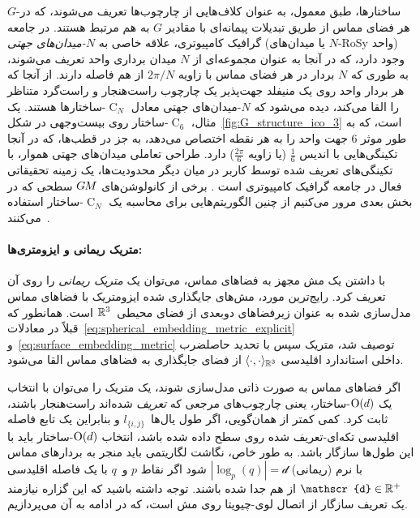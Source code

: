 $G$-ساختارها، طبق معمول، به عنوان کلاف‌هایی از چارچوب‌ها تعریف می‌شوند، که در هر فضای مماس از طریق تبدیلات پیمانه‌ای با مقادیر $G$ به هم مرتبط هستند.
در جامعه گرافیک کامپیوتری، علاقه خاصی به \emph{$N$-میدان‌های جهتی} (یا میدان‌های $N$-RoSy واحد) وجود دارد، که در آنجا به عنوان مجموعه‌ای از $N$ میدان برداری واحد تعریف می‌شوند، به طوری که $N$ بردار در هر فضای مماس با زاویه $2\pi/N$ از هم فاصله دارند.
از آنجا که هر بردار واحد روی یک منیفلد جهت‌پذیر یک چارچوب راست‌هنجار و راست‌گرد متناظر را القا می‌کند، دیده می‌شود که $N$-میدان‌های جهتی معادل $\operatorname{C}_N$-ساختارها هستند.
یک مثال، $\operatorname{C}_6$-ساختار روی بیست‌وجهی در شکل~\ref{fig:G_structure_ico_3} است، که به طور موثر $6$ جهت واحد را به هر نقطه اختصاص می‌دهد، به جز در قطب‌ها، که در آنجا تکینگی‌هایی با اندیس $\frac{1}{6}$ (یا زاویه $\frac{2\pi}{6}$) دارد.
طراحی تعاملی میدان‌های جهتی هموار، با تکینگی‌های تعریف شده توسط کاربر در میان دیگر محدودیت‌ها، یک زمینه تحقیقاتی فعال در جامعه گرافیک کامپیوتری است
\cite{li2006representing,ray2008nSymmDirectionField,lai2009metric,craneTrivialConnectionsDiscrete2010,Knoppel:2013:GOD,liu2016discreteConnection,Sharp2019VectorHeatMethod}.
برخی از کانولوشن‌های $G\mkern-1.4muM$ سطحی که در بخش بعدی مرور می‌کنیم از چنین الگوریتم‌هایی برای محاسبه یک $\operatorname{C}_N$-ساختار استفاده می‌کنند~\cite{huang2019texturenet,Yang2020parallelFrameCNN}.



\paragraph{متریک ریمانی و ایزومتری‌ها:}
با داشتن یک مش مجهز به فضاهای مماس، می‌توان یک \emph{متریک ریمانی} را روی آن تعریف کرد.
رایج‌ترین مورد، مش‌های جایگذاری شده ایزومتریک با فضاهای مماس مدل‌سازی شده به عنوان زیرفضاهای دوبعدی از فضای محیطی~$\mathbb{R}^3$ است.
همانطور که قبلاً در معادلات~\eqref{eq:spherical_embedding_metric_explicit} و~\eqref{eq:surface_embedding_metric} توصیف شد، متریک سپس با تحدید حاصلضرب داخلی استاندارد اقلیدسی $\langle\cdot,\cdot\rangle_{\mathbb{R}^3}$ از فضای جایگذاری به فضاهای مماس القا می‌شود.

اگر فضاهای مماس به صورت ذاتی مدل‌سازی شوند، یک متریک را می‌توان با انتخاب یک $\operatorname{O}(d)$-ساختار، یعنی چارچوب‌های مرجعی که \emph{تعریف} شده‌اند راست‌هنجار باشند، ثابت کرد.
کمی کمتر از همان‌گویی، اگر طول یال‌ها~$l_{\{i,j\}}$ و بنابراین یک تابع فاصله اقلیدسی تکه‌ای-تعریف شده روی سطح داده شده باشد، انتخاب $\operatorname{O}(d)$-ساختار باید با این طول‌ها سازگار باشد.
به طور خاص، نگاشت لگاریتمی باید منجر به بردارهای مماس با نرم (ریمانی) $|\log_p(q)| = \mathscr{d}$ شود اگر نقاط $p$ و~$q$ با یک فاصله اقلیدسی $\mathscr{d} \in \R^+$ از هم جدا شده باشند.
توجه داشته باشید که این گزاره نیازمند یک تعریف سازگار از اتصال لوی-چیویتا روی مش است، که در ادامه به آن می‌پردازیم.


